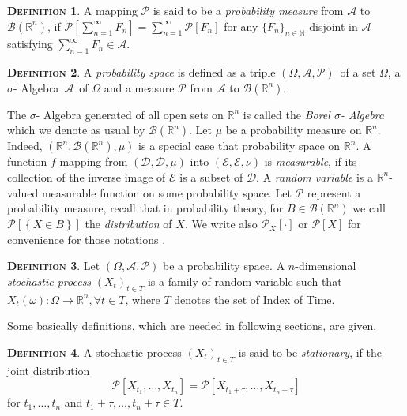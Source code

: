 \documentclass[a4paper, twoside, 11pt]{article}
\theoremstyle{definition}
\newtheorem{definition}{\scshape Definition}[section]
\def\AA{$\mathscr{A}$\ }
\def\sa{$\sigma$- Algebra\ }
\def\bs{$(\Omega, \mathscr{A}, \mathcal{P})$\ }
\def\bsigma{\mathscr{B}\brkt{\mathbb{R}^{n}}}
\newcommand{\sqbr}[1]{\left[ {#1} \right]}
\newcommand{\brkt}[1]{\left({#1} \right)}
\begin{document}
\begin{definition}
  A mapping $\mathcal{P}$ is said to be a \emph{probability measure} from $\mathscr{A}$ to $\bsigma$, if $\mathcal{P}\sqbr{\sum_{n=1}^{\infty} F_n} = \sum_{n=1}^{\infty} \mathcal{P}\sqbr{F_n}$ for any $\{F_n\}_{n \in \mathbb{N}}$ disjoint in $\mathscr{A}$ satisfying $\sum_{n=1}^{\infty}F_n \in \mathscr{A}$. 
\end{definition}

\begin{definition}
  A \emph{probability space} is defined as a triple \bs of a set $\Omega$, a \sa \AA  of $\Omega$ and a measure $\mathcal{P}$ from $\mathscr{A}$ to $\bsigma$.
\end{definition}

The $\sigma$- Algebra generated of all open sets on $\mathbb{R}^{n}$ is called the \emph{Borel $\sigma$- Algebra} which we denote as usual by $\mathscr{B}\left(\mathbb{R}^{n}\right)$. Let $\mu$ be a probability measure on $\mathbb{R}^{n}$. Indeed, $\brkt{\mathbb{R}^{n}, \mathscr{B}\brkt{\mathbb{R}^{n}}, \mu}$ is a special case that probability space on $\mathbb{R}^{n}$. A function $f$ mapping from $\brkt{\mathcal{D}, \mathscr{D}, \mu}$ into $\brkt{\mathcal{E}, \mathscr{E}, \nu}$ is \emph{measurable}, if its collection of the inverse image of $\mathscr{E}$ is a subset of $\mathscr{D}$. A \emph{random variable} is a $\mathbb{R}^{n}$-valued measurable function on some probability space. Let $\mathcal{P}$ represent a probability measure, recall that in probability theory, for $B \in \bsigma$ we call $\mathcal{P}\sqbr{\left\{X \in B\right\}}$ the \emph{distribution} of $X$. We write also $\mathcal{P}_X \sqbr{\cdot}$ or $\mathcal{P}\sqbr{X}$ for convenience for those notations .

\begin{definition}
  Let $\brkt{\Omega, \mathscr{A}, \mathcal{P}}$ be a probability space. A $n$-dimensional \emph{stochastic process} $\brkt{X_t}_{t\in T}$ is a family of random variable such that $X_t\brkt{\omega} : \Omega \longrightarrow  \mathbb{R}^{n},  \forall t \in T$, where $T$ denotes the set of Index of Time.    
\end{definition}

Some basically definitions, which are needed in following sections, are given.
\begin{definition}
  A stochastic process $\brkt{X_t}_{t \in T}$ is said to be \emph{stationary}, if the joint distribution 
\[
  \mathcal{P}\sqbr{X_{t_1},\dots,X_{t_n}} = \mathcal{P}\sqbr{X_{t_1+\tau},\dots,X_{t_n+\tau}} 
\]
for $t_1, \dots, t_n$ and $t_1+\tau,\dots,t_n+\tau \in T$. 
\label{sec:stn}
\end{definition}
\end{document}
